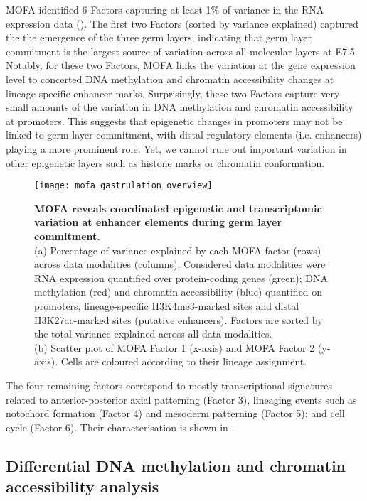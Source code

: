 MOFA identified 6 Factors capturing at least 1\% of variance in the RNA expression data (). The first two Factors (sorted by variance explained) captured the the emergence of the three germ layers, indicating that germ layer commitment is the largest source of variation across all molecular layers at E7.5. Notably, for these two Factors, MOFA links the variation at the gene expression level to concerted DNA methylation and chromatin accessibility changes at lineage-specific enhancer marks. Surprisingly, these two Factors capture very small amounts of the variation in DNA methylation and chromatin accessibility at promoters. This suggests that epigenetic changes in promoters may not be linked to germ layer commitment, with distal regulatory elements (i.e. enhancers) playing a more prominent role. Yet, we cannot rule out important variation in other epigenetic layers such as histone marks or chromatin conformation.

\begin{figure}[H]
	\centering
	\texttt{[image: mofa\_gastrulation\_overview]}
	\caption[]{
	\textbf{MOFA reveals coordinated epigenetic and transcriptomic variation at enhancer elements during germ layer commitment.} \\
	(a) Percentage of variance explained by each MOFA factor (rows) across data modalities (columns). Considered data modalities were RNA expression quantified over protein-coding genes (green); DNA methylation (red) and chromatin accessibility (blue) quantified on promoters, lineage-specific H3K4me3-marked sites and distal H3K27ac-marked sites (putative enhancers). Factors are sorted by the total variance explained across all data modalities. \\
	(b) Scatter plot of MOFA Factor 1 (x-axis) and MOFA Factor 2 (y-axis). Cells are coloured according to their lineage assignment.
	}
	\label{fig:mofa_gastrulation_overview}
\end{figure}

The four remaining factors correspond to mostly transcriptional signatures related to anterior-posterior axial patterning (Factor 3), lineaging events such as notochord formation (Factor 4) and mesoderm patterning (Factor 5); and cell cycle (Factor 6). Their characterisation is shown in .

\subsection{Differential DNA methylation and chromatin accessibility analysis}

